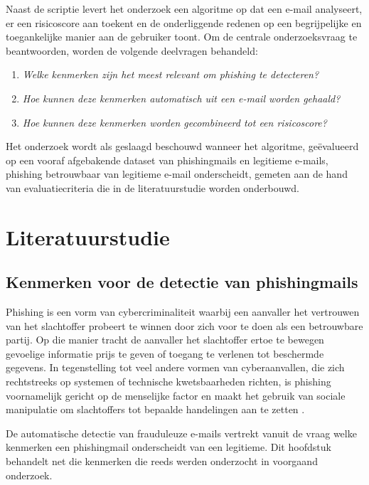 Naast de scriptie levert het onderzoek een algoritme op dat een e-mail analyseert, er een risicoscore aan toekent en de onderliggende redenen op een begrijpelijke en toegankelijke manier aan de gebruiker toont. Om de centrale onderzoeksvraag te beantwoorden, worden de volgende deelvragen behandeld:

\begin{enumerate}
  \item \emph{Welke kenmerken zijn het meest relevant om phishing te detecteren?}
  \item \emph{Hoe kunnen deze kenmerken automatisch uit een e-mail worden gehaald?}
  \item \emph{Hoe kunnen deze kenmerken worden gecombineerd tot een risicoscore?}
\end{enumerate}

Het onderzoek wordt als geslaagd beschouwd wanneer het algoritme, geëvalueerd op een vooraf afgebakende dataset van phishingmails en legitieme e-mails, phishing betrouwbaar van legitieme e-mail onderscheidt, gemeten aan de hand van evaluatiecriteria die in de literatuurstudie worden onderbouwd.


\section{Literatuurstudie}%
\label{sec:literatuurstudie}

\subsection{Kenmerken voor de detectie van phishingmails}
\label{subsec:Kenmerken voor de detectie van phishingmails}
Phishing is een vorm van cybercriminaliteit waarbij een aanvaller het vertrouwen van het slachtoffer probeert te winnen door zich voor te doen als een betrouwbare partij. Op die manier tracht de aanvaller het slachtoffer ertoe te bewegen gevoelige informatie prijs te geven of toegang te verlenen tot beschermde gegevens. In tegenstelling tot veel andere vormen van cyberaanvallen, die zich rechtstreeks op systemen of technische kwetsbaarheden richten, is phishing voornamelijk gericht op de menselijke factor en maakt het gebruik van sociale manipulatie om slachtoffers tot bepaalde handelingen aan te zetten \autocite{Hong2012}.

De automatische detectie van frauduleuze e-mails vertrekt vanuit de vraag welke kenmerken een phishingmail onderscheidt van een legitieme. Dit hoofdstuk behandelt net die kenmerken die reeds werden onderzocht in voorgaand onderzoek.


